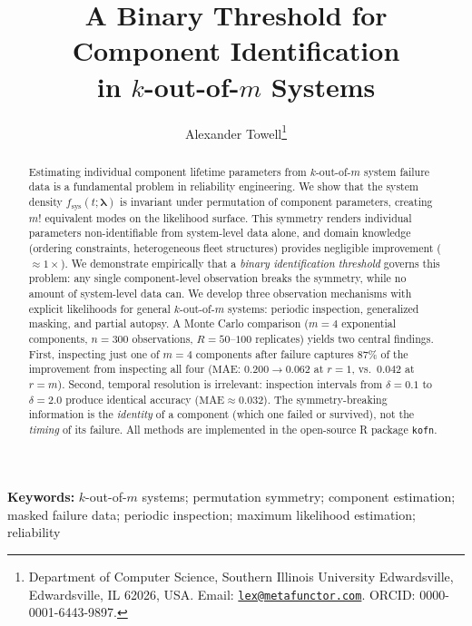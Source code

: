 \documentclass[12pt]{article}
\title{A Binary Threshold for Component Identification\\
  in $k$-out-of-$m$ Systems}
\author{
  Alexander Towell\thanks{
    Department of Computer Science,
    Southern Illinois University Edwardsville, Edwardsville, IL 62026, USA.
    Email: \href{mailto:lex@metafunctor.com}{\texttt{lex@metafunctor.com}}.
    ORCID: 0000-0001-6443-9897.}
}
\date{}
\newcommand{\fsys}{f_{\mathrm{sys}}}
\newcommand{\MAE}{\mathrm{MAE}}
\newcommand{\blambda}{\boldsymbol{\lambda}}
\begin{document}
\maketitle


\begin{abstract}
Estimating individual component lifetime parameters from $k$-out-of-$m$ system
failure data is a fundamental problem in reliability engineering.  We show that
the system density $\fsys(t; \blambda)$ is invariant under permutation of
component parameters, creating $m!$ equivalent modes on the likelihood surface.
This symmetry renders individual parameters non-identifiable from system-level
data alone, and domain knowledge (ordering constraints, heterogeneous fleet
structures) provides negligible improvement (${\approx}1\times$).
We demonstrate empirically that a \emph{binary identification threshold} governs this problem:
any single component-level observation breaks the symmetry, while no amount of
system-level data can.  We develop three observation mechanisms with explicit
likelihoods for general $k$-out-of-$m$ systems: periodic inspection,
generalized masking, and partial autopsy.  A Monte Carlo comparison
($m = 4$ exponential components, $n = 300$ observations, $R = 50$--$100$ replicates)
yields two central findings.  First, inspecting just one of $m = 4$ components
after failure captures 87\% of the improvement from inspecting all four
($\MAE$: $0.200 \to 0.062$ at $r = 1$, vs.\ $0.042$ at $r = m$).
Second, temporal resolution is irrelevant: inspection intervals from
$\delta = 0.1$ to $\delta = 2.0$ produce identical accuracy
($\MAE \approx 0.032$).  The symmetry-breaking information is the
\emph{identity} of a component (which one failed or survived), not the
\emph{timing} of its failure.  All methods are implemented in the open-source
R package \texttt{kofn}.
\end{abstract}

\medskip
\noindent
\textbf{Keywords:}
$k$-out-of-$m$ systems; permutation symmetry; component estimation;
masked failure data; periodic inspection; maximum likelihood estimation;
reliability

\end{document}

